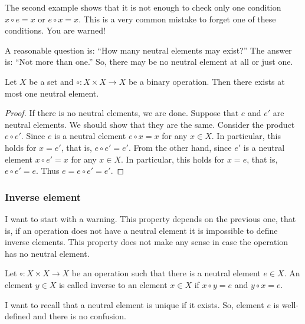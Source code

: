 The second example shows that it is not enough to check only one condition $x \circ e = x$ or $e \circ x = x$.
This is a very common mistake to forget one of these conditions.
You are warned!

A reasonable question is: ``How many neutral elements may exist?'' The answer is: ``Not more than one.'' So, there may be no neutral element at all or just one.

\begin{claim}
Let $X$ be a set and $\circ \colon X\times X\to X$ be a binary operation.
Then there exists at most one neutral element.
\end{claim}
\begin{proof}
If there is no neutral elements, we are done.
Suppose that $e$ and $e'$ are neutral elements.
We should show that they are the same.
Consider the product $e \circ e'$.
Since $e$ is a neutral element $e \circ x = x$ for any $x\in X$.
In particular, this holds for $x = e'$, that is, $ e \circ e' = e'$.
From the other hand, since $e'$ is a neutral element $x \circ e' = x$ for any $x\in X$.
In particular, this holds for $x = e$, that is, $e \circ e' = e$.
Thus $e = e\circ e' = e'$.
\end{proof}

\subsubsection{Inverse element}

I want to start with a warning.
This property depends on the previous one, that is, if an operation does not have a neutral element it is impossible to define inverse elements.
This property does not make any sense in case the operation has no neutral element.

\begin{definition}
Let $\circ \colon X\times X\to X$ be an operation such that there is a neutral element $e\in X$.
An element $y\in X$ is called inverse to an element $x\in X$ if $x \circ y = e$ and $y \circ x = e$.
\end{definition}

I want to recall that a neutral element is unique if it exists.
So, element $e$ is well-defined and there is no confusion.

